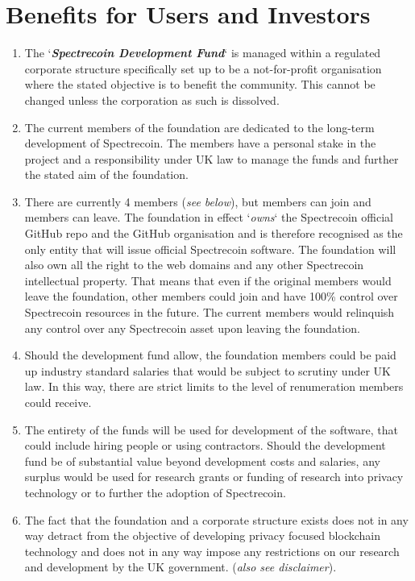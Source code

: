 \section{Benefits for Users and Investors}
\begin{enumerate}
	\item The ‘\textbf{\textit{Spectrecoin Development Fund}}‘ is managed 
	within a regulated corporate structure specifically set up to be a 
	not-for-profit organisation where the stated objective is to benefit 
	the community. This cannot be changed unless the corporation as such 
	is dissolved.
	\item The current members of the foundation are dedicated to the long-term 
	development of Spectrecoin. The members have a personal stake in the 
	project and a responsibility under UK law to manage the funds and further 
	the stated aim of the foundation.
	\item There are currently 4 members (\textit{see below}), but members can 
	join and members can leave. The foundation in effect ‘\textit{owns}‘ the 
	Spectrecoin official GitHub repo and the GitHub organisation and is 
	therefore recognised as the only entity that will issue official 
	Spectrecoin software. The foundation will also own all the right to the 
	web domains and any other Spectrecoin intellectual property. That means 
	that even if the original members would leave the foundation, other 
	members could join and have 100\% control over Spectrecoin resources in 
	the future. The current members would relinquish any control over any 
	Spectrecoin asset upon leaving the foundation.
	\item Should the development fund allow, the foundation members could be 
	paid up industry standard salaries that would be subject to scrutiny 
	under UK law. In this way, there are strict limits to the level of 
	renumeration members could receive.
	\item The entirety of the funds will be used for development of the 
	software, that could include hiring people or using contractors. Should 
	the development fund be of substantial value beyond development costs 
	and salaries, any surplus would be used for research grants or funding 
	of research into privacy technology or to further the adoption of 
	Spectrecoin.
	\item The fact that the foundation and a corporate structure exists 
	does not in any way detract from the objective of developing privacy 
	focused blockchain technology and does not in any way impose any 
	restrictions on our research and development by the UK government. 
	(\textit{also see disclaimer}).
\end{enumerate}



